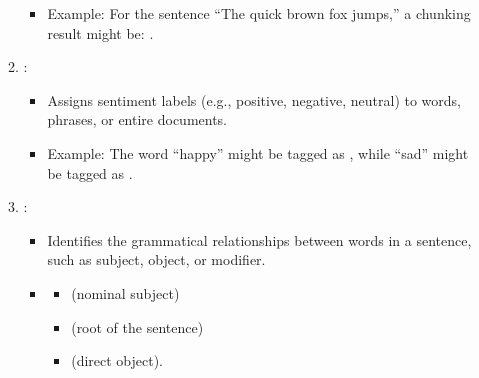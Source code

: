 \documentclass[letterpaper,11pt,english]{sphinxmanual}
\begin{document}
\begin{itemize}
\begin{enumerate}
\begin{itemize}
\item {} 
\sphinxAtStartPar
Example: For the sentence “The quick brown fox jumps,” a chunking result might be:
\sphinxhyphen{} .

\end{itemize}

\item {} 
\sphinxAtStartPar
{}:
\begin{itemize}
\item {} 
\sphinxAtStartPar
Assigns sentiment labels (e.g., positive, negative, neutral) to words, phrases, or entire documents.

\item {} 
\sphinxAtStartPar
Example: The word “happy” might be tagged as , while “sad” might be tagged as .

\end{itemize}

\item {} 
\sphinxAtStartPar
{}:
\begin{itemize}
\item {} 
\sphinxAtStartPar
Identifies the grammatical relationships between words in a sentence, such as subject, object, or modifier.

\item {} \begin{description}
\begin{itemize}
\item {} 
\sphinxAtStartPar
{} (nominal subject)

\item {} 
\sphinxAtStartPar
{} (root of the sentence)

\item {} 
\sphinxAtStartPar
{} (direct object).

\end{itemize}

\end{description}

\end{itemize}

\end{enumerate}


\end{itemize}
\end{document}
